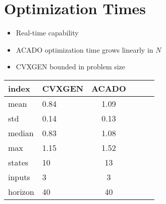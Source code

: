 \ETHslide
\section*{Optimization Times}
\vspace*{\fill}
\begin{minipage}{0.49\textwidth}
\begin{itemize}
\item[\ETHitem] Real-time capability
\item[\ETHitem] ACADO optimization time grows linearly in $N$
\item[\ETHitem] CVXGEN bounded in problem size
\end{itemize}
\end{minipage}
\begin{minipage}{0.5\textwidth}
\centering

\tiny{

}
	
\tiny{
\begin{tabular}{ll|cccc}
\hline
 index   & CVXGEN       & ACADO       \\ \hline \hline
mean  & \num{0.84} & \num{1.09}\\
std    & \num{0.14} & \num{0.13}\\
median & \num{0.83} & \num{1.08}\\
max    & \num{1.15} & \num{1.52}\\
\hline
states  & 10 & 13 \\
inputs  & 3  & 3  \\
horizon & \num{40} & \num{40} \\
\hline
\end{tabular}
}
\end{minipage}


\vspace*{\fill}
\clearpage